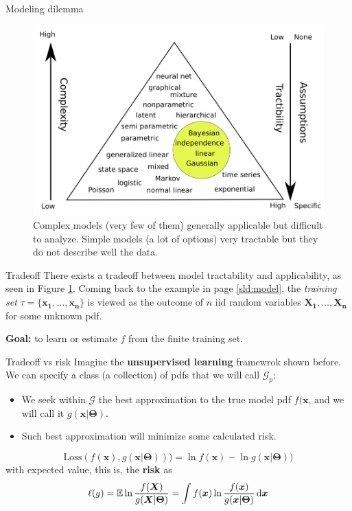 \documentclass{beamer}
\begin{document}
\begin{frame}{Modeling dilemma}
  \begin{figure}
    \includegraphics[width=0.7\linewidth]{dilemma}
    \caption{Complex models (very few of them) generally applicable but difficult to analyze. Simple models (a lot of options) very tractable but they do not describe well the data\cite{kroese2020}.}
    \label{fig:dilemma}
  \end{figure}
\end{frame}

\begin{frame}{Tradeoff}
  There exists a tradeoff between model tractability and applicability, as seen in Figure \ref{fig:dilemma}. Coming back to the example in page \ref{sld:model}, the {\em training set} $\tau = \{\bm{x_1},\ldots,\bm{x_n}\}$ is viewed as the outcome of $n$ iid random variables $\bm{X_1},\ldots,\bm{X_n}$ for some unknown pdf.

  {\bf Goal:} to learn or estimate $f$ from the finite training set.
\end{frame}

\begin{frame}{Tradeoff vs risk}
  Imagine the {\bf unsupervised learning} framewrok shown before. We can specify a class (a collection) of pdfs  that we will call $\mathcal{G}_p$:
  \begin{itemize}
    \item We seek within $\mathcal{G}$ the best approximation to the true model pdf $f(\bm{x}$, and we will call it $g(\bm{x}|\bm{\Theta})$. 
    \item Such best approximation will minimize some calculated risk.
  \end{itemize}
  \[
    \mathrm{Loss}(f(\bm{x}),g(\bm{x}|\bm{\Theta})))=\ln f(\bm{x}) - \ln g(\bm{x}|\bm{\Theta}))
    \]
    with expected value, this is, the {\bf risk} as
    \[
    \ell(g)= \mathbb{E}  \ln \frac{f(\bm{X})}{g(\bm{X}|\bm{\Theta})} = \int f(\bm{x}) \ln \frac{f(\bm{x})}{g(\bm{x}|\bm{\Theta})} \mathop{}\!\mathrm{d} \bm{x}
    \]
\end{frame}
\end{document}
